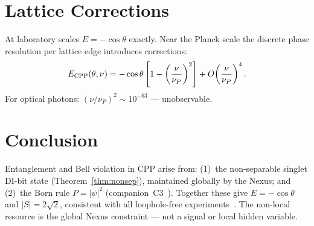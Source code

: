 \documentclass[11pt,a4paper]{article}
\begin{document}
\section{Lattice Corrections}

At laboratory scales $E = -\cos\theta$ exactly.  Near the Planck scale
the discrete phase resolution per lattice edge introduces corrections:
\begin{equation}
E_{\rm CPP}(\theta,\nu)
= -\cos\theta\left[1 - \left(\frac{\nu}{\nu_P}\right)^2\right]
+ O\!\left(\frac{\nu}{\nu_P}\right)^4.
\end{equation}
For optical photons: $(\nu/\nu_P)^2 \sim 10^{-63}$ --- unobservable.

\section{Conclusion}

Entanglement and Bell violation in CPP arise from:
(1)~the non-separable singlet DI-bit state (Theorem~\ref{thm:nonsep}),
maintained globally by the Nexus; and
(2)~the Born rule $P = |\psi|^2$ (companion~C3~\cite{abshier2026c3}).
Together these give $E = -\cos\theta$ and $|S| = 2\sqrt{2}$, consistent
with all loophole-free experiments~\cite{hensen2015,giustina2015,shalm2015}.
The non-local resource is the global Nexus constraint --- not a signal
or local hidden variable.
\end{document}
